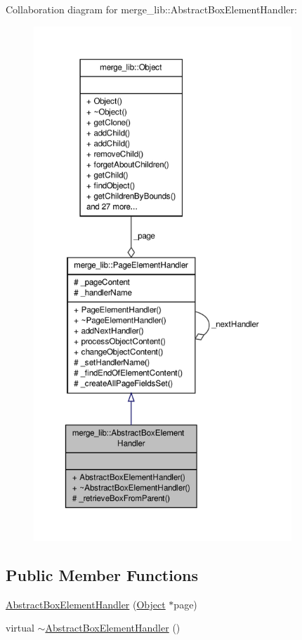 Collaboration diagram for merge\-\_\-lib\-:\-:Abstract\-Box\-Element\-Handler\-:
\nopagebreak
\begin{figure}[H]
\begin{center}
\leavevmode
\includegraphics[height=550pt]{de/d76/classmerge__lib_1_1_abstract_box_element_handler__coll__graph}
\end{center}
\end{figure}
\subsection*{Public Member Functions}
\begin{DoxyCompactItemize}
\item 
\hyperlink{classmerge__lib_1_1_abstract_box_element_handler_ad913821de9e02070f035abd700b8548d}{Abstract\-Box\-Element\-Handler} (\hyperlink{classmerge__lib_1_1_object}{Object} $\ast$page)
\item 
virtual \hyperlink{classmerge__lib_1_1_abstract_box_element_handler_a02993821513274241f95b15c42e7a220}{$\sim$\-Abstract\-Box\-Element\-Handler} ()
\end{DoxyCompactItemize}
